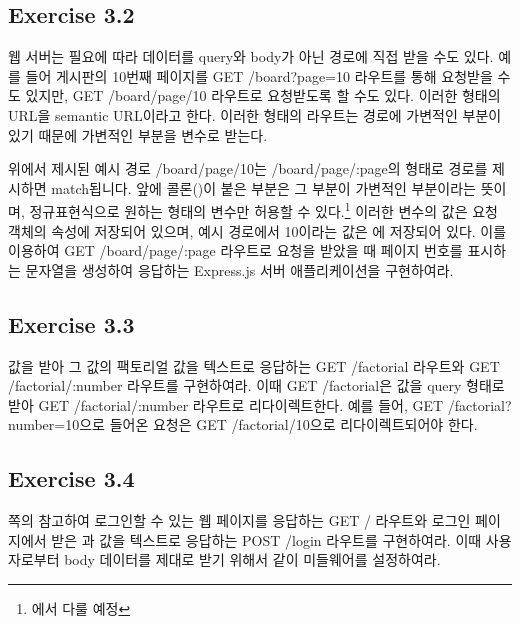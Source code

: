 \subsection*{Exercise 3.2}

웹 서버는 필요에 따라 데이터를 query와 body가 아닌 경로에 직접 받을 수도 있다. 예를 들어 게시판의 10번째 페이지를 GET /board?page=10 라우트를 통해 요청받을 수도 있지만, GET /board/page/10 라우트로 요청받도록 할 수도 있다. 이러한 형태의 URL을 semantic URL이라고 한다. 이러한 형태의 라우트는 경로에 가변적인 부분이 있기 때문에 가변적인 부분을 변수로 받는다.

위에서 제시된 예시 경로 /board/page/10는 /board/page/:page의 형태로 경로를 제시하면 match됩니다. 앞에 콜론(\cd{:})이 붙은 부분은 그 부분이 가변적인 부분이라는 뜻이며, 정규표현식으로 원하는 형태의 변수만 허용할 수 있다.\footnote{에서 다룰 예정} 이러한 변수의 값은 요청 객체의  속성에 저장되어 있으며, 예시 경로에서 10이라는 값은 에 저장되어 있다. 이를 이용하여 GET /board/page/:page 라우트로 요청을 받았을 때 페이지 번호를 표시하는 문자열을 생성하여 응답하는 Express.js 서버 애플리케이션을 구현하여라.


\subsection*{Exercise 3.3}

 값을 받아 그 값의 팩토리얼 값을 텍스트로 응답하는 GET /factorial 라우트와 GET /factorial/:number 라우트를 구현하여라. 이때 GET /factorial은  값을 query 형태로 받아 GET /factorial/:number 라우트로 리다이렉트한다. 예를 들어, GET /factorial?number=10으로 들어온 요청은 GET /factorial/10으로 리다이렉트되어야 한다.

\subsection*{Exercise 3.4}

\pageref{code:form-tag}쪽의 \를 참고하여 로그인할 수 있는 웹 페이지를 응답하는 GET / 라우트와 로그인 페이지에서 받은 과  값을 텍스트로 응답하는 POST /login 라우트를 구현하여라. 이때 사용자로부터 body 데이터를 제대로 받기 위해서 \와 같이 미들웨어를 설정하여라.
